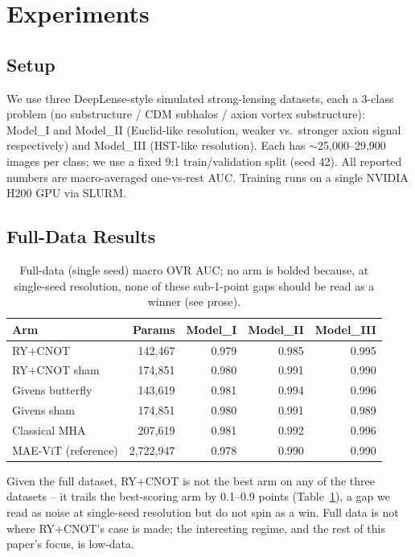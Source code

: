 \documentclass[10pt,letterpaper]{article}
\theoremstyle{plain}
\theoremstyle{definition}
\begin{document}
\section{Experiments}

\subsection{Setup}
\label{sec:setup}

We use three DeepLense-style simulated strong-lensing datasets, each a
3-class problem (no substructure / CDM subhalos / axion vortex
substructure): Model\_I and Model\_II (Euclid-like resolution, weaker vs.\
stronger axion signal respectively) and Model\_III (HST-like resolution).
Each has $\sim$25,000--29,900 images per class; we use a fixed 9:1
train/validation split (seed 42). All reported numbers are macro-averaged
one-vs-rest AUC. Training runs on a single NVIDIA H200 GPU via SLURM.

\subsection{Full-Data Results}
\label{sec:fulldata}

\begin{table}[h]
\centering\small
\begin{tabular}{@{}lrrrr@{}}
\toprule
Arm & Params & Model\_I & Model\_II & Model\_III \\
\midrule
RY+CNOT & 142,467 & 0.979 & 0.985 & 0.995 \\
RY+CNOT sham & 174,851 & 0.980 & 0.991 & 0.990 \\
Givens butterfly & 143,619 & 0.981 & 0.994 & 0.996 \\
Givens sham & 174,851 & 0.980 & 0.991 & 0.989 \\
Classical MHA & 207,619 & 0.981 & 0.992 & 0.996 \\
MAE-ViT (reference) & 2,722,947 & 0.978 & 0.990 & 0.990 \\
\bottomrule
\end{tabular}
\caption{Full-data (single seed) macro OVR AUC; no arm is bolded because,
at single-seed resolution, none of these sub-1-point gaps should be read
as a winner (see prose).}
\label{tab:fulldata}
\end{table}

Given the full dataset, RY+CNOT is not the best arm on any of the three
datasets -- it trails the best-scoring arm by 0.1--0.9 points
(Table~\ref{tab:fulldata}), a gap we read as noise at single-seed
resolution but do not spin as a win. Full data is not where RY+CNOT's case
is made; the interesting regime, and the rest of this paper's focus, is
low-data.
\end{document}
